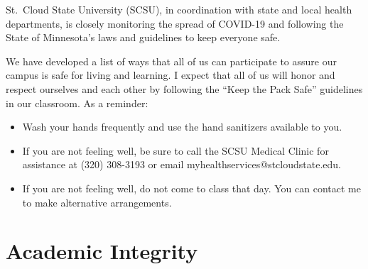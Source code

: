 \documentclass{tufte-handout}
\begin{document}
\begin{fullwidth}
St.\ Cloud State University (SCSU), in coordination with state and local health departments, is closely monitoring the spread of COVID-19 and following the State of Minnesota's laws and guidelines to keep everyone safe.

We have developed a list of ways that all of us can participate to assure our campus is safe for living and learning. I expect that all of us will honor and respect ourselves and each other by following the ``Keep the Pack Safe'' guidelines in our classroom. As a reminder:

\begin{itemize}
\item Wash your hands frequently and use the hand sanitizers available to you.
\item If you are not feeling well, be sure to call the SCSU Medical Clinic for assistance at (320) 308-3193 or email myhealthservices@stcloudstate.edu. 
\item If you are not feeling well, do not come to class that day. You can contact me to make alternative arrangements.
\end{itemize}

\section{Academic Integrity}



\end{fullwidth}
\end{document}

